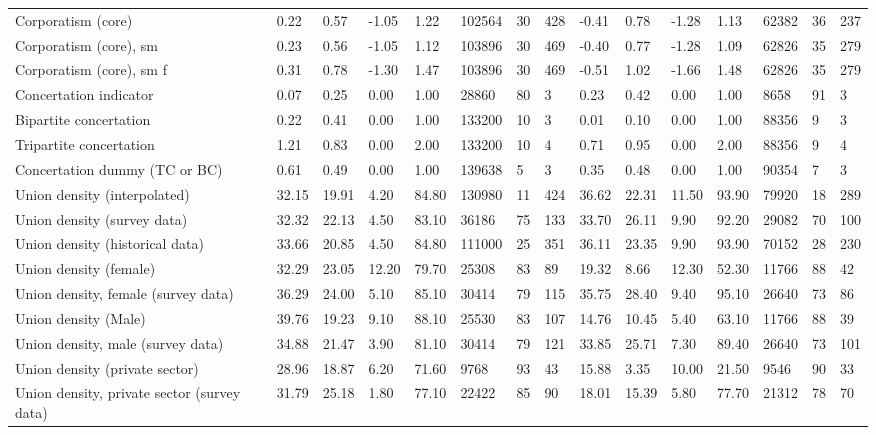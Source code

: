 \begin{longtable}{lllllllllllllll}
Corporatism (core) & 0.22 & 0.57 & -1.05 & 1.22 & 102564 & 30 & 428 & -0.41 & 0.78 & -1.28 & 1.13 & 62382 & 36 & 237\\
\addlinespace
Corporatism (core), sm & 0.23 & 0.56 & -1.05 & 1.12 & 103896 & 30 & 469 & -0.40 & 0.77 & -1.28 & 1.09 & 62826 & 35 & 279\\
Corporatism (core), sm f & 0.31 & 0.78 & -1.30 & 1.47 & 103896 & 30 & 469 & -0.51 & 1.02 & -1.66 & 1.48 & 62826 & 35 & 279\\
Concertation indicator & 0.07 & 0.25 & 0.00 & 1.00 & 28860 & 80 & 3 & 0.23 & 0.42 & 0.00 & 1.00 & 8658 & 91 & 3\\
Bipartite concertation & 0.22 & 0.41 & 0.00 & 1.00 & 133200 & 10 & 3 & 0.01 & 0.10 & 0.00 & 1.00 & 88356 & 9 & 3\\
Tripartite concertation & 1.21 & 0.83 & 0.00 & 2.00 & 133200 & 10 & 4 & 0.71 & 0.95 & 0.00 & 2.00 & 88356 & 9 & 4\\
\addlinespace
Concertation dummy (TC or BC) & 0.61 & 0.49 & 0.00 & 1.00 & 139638 & 5 & 3 & 0.35 & 0.48 & 0.00 & 1.00 & 90354 & 7 & 3\\
Union density (interpolated) & 32.15 & 19.91 & 4.20 & 84.80 & 130980 & 11 & 424 & 36.62 & 22.31 & 11.50 & 93.90 & 79920 & 18 & 289\\
Union density (survey data) & 32.32 & 22.13 & 4.50 & 83.10 & 36186 & 75 & 133 & 33.70 & 26.11 & 9.90 & 92.20 & 29082 & 70 & 100\\
Union density (historical data) & 33.66 & 20.85 & 4.50 & 84.80 & 111000 & 25 & 351 & 36.11 & 23.35 & 9.90 & 93.90 & 70152 & 28 & 230\\
Union density (female) & 32.29 & 23.05 & 12.20 & 79.70 & 25308 & 83 & 89 & 19.32 & 8.66 & 12.30 & 52.30 & 11766 & 88 & 42\\
\addlinespace
Union density, female (survey data) & 36.29 & 24.00 & 5.10 & 85.10 & 30414 & 79 & 115 & 35.75 & 28.40 & 9.40 & 95.10 & 26640 & 73 & 86\\
Union density (Male) & 39.76 & 19.23 & 9.10 & 88.10 & 25530 & 83 & 107 & 14.76 & 10.45 & 5.40 & 63.10 & 11766 & 88 & 39\\
Union density, male (survey data) & 34.88 & 21.47 & 3.90 & 81.10 & 30414 & 79 & 121 & 33.85 & 25.71 & 7.30 & 89.40 & 26640 & 73 & 101\\
Union density (private sector) & 28.96 & 18.87 & 6.20 & 71.60 & 9768 & 93 & 43 & 15.88 & 3.35 & 10.00 & 21.50 & 9546 & 90 & 33\\
Union density, private sector (survey data) & 31.79 & 25.18 & 1.80 & 77.10 & 22422 & 85 & 90 & 18.01 & 15.39 & 5.80 & 77.70 & 21312 & 78 & 70\\

\end{longtable}
